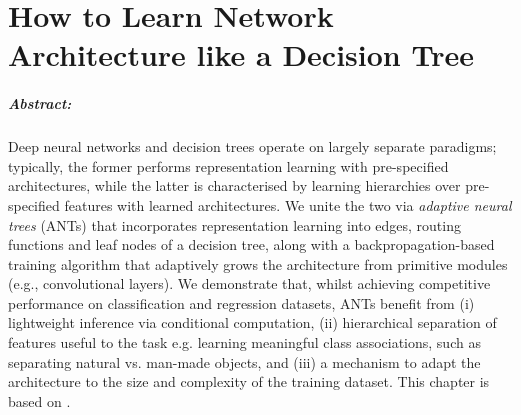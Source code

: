 %
%
\chapter{How to Learn Network Architecture like a Decision Tree}
\label{chapter:ant}

\paragraph{Abstract:} Deep neural networks and decision trees operate on largely separate paradigms; typically, the former performs representation learning with pre-specified architectures, while the latter is characterised by learning hierarchies over pre-specified features with learned architectures. We unite the two via \emph{adaptive neural trees} (ANTs) that incorporates representation learning into edges, routing functions and leaf nodes of a decision tree, along with a backpropagation-based training algorithm that adaptively grows the architecture from primitive modules (e.g., convolutional layers). We demonstrate that, whilst achieving competitive performance on classification and regression datasets, ANTs benefit from (i) lightweight inference via conditional computation, (ii) hierarchical separation of features useful to the task e.g. learning meaningful class associations, such as separating natural vs. man-made objects, and (iii) a mechanism to adapt the architecture to the size and complexity of the training dataset. This chapter is based on \cite{AdaptiveNeuralTrees19}. 

